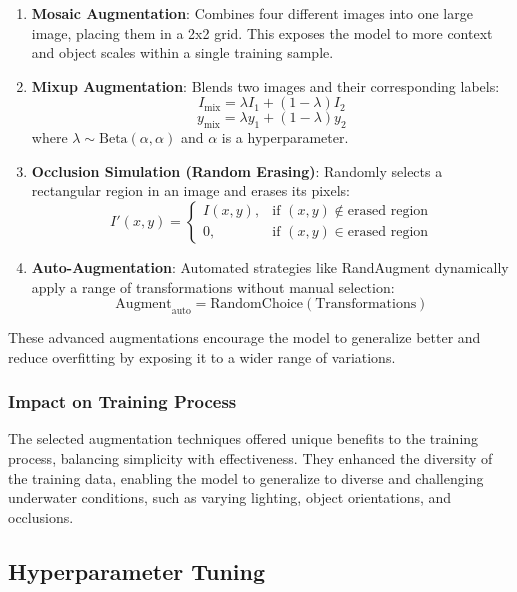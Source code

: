 \documentclass[conference]{IEEEtran}
\begin{document}
\begin{enumerate}
    \item \textbf{Mosaic Augmentation}:
    Combines four different images into one large image, placing them in a 2x2 grid. This exposes the model to more context and object scales within a single training sample.

    \item \textbf{Mixup Augmentation}:
    Blends two images and their corresponding labels:
    \[
    I_{\text{mix}} = \lambda I_1 + (1 - \lambda) I_2
    \]
    \[
    y_{\text{mix}} = \lambda y_1 + (1 - \lambda) y_2
    \]
    where \( \lambda \sim \text{Beta}(\alpha, \alpha) \) and \( \alpha \) is a hyperparameter.

    \item \textbf{Occlusion Simulation (Random Erasing)}:
    Randomly selects a rectangular region in an image and erases its pixels:
    \[
    I'(x, y) =
    \begin{cases}
    I(x, y), & \text{if } (x, y) \notin \text{erased region} \\
    0, & \text{if } (x, y) \in \text{erased region}
    \end{cases}
    \]

    \item \textbf{Auto-Augmentation}:
    Automated strategies like RandAugment dynamically apply a range of transformations without manual selection:
    \[
    \text{Augment}_{\text{auto}} = \text{RandomChoice}(\text{Transformations})
    \]
\end{enumerate}

These advanced augmentations encourage the model to generalize better and reduce overfitting by exposing it to a wider range of variations.

\subsubsection{Impact on Training Process}

The selected augmentation techniques offered unique benefits to the training process, balancing simplicity with effectiveness. They enhanced the diversity of the training data, enabling the model to generalize to diverse and challenging underwater conditions, such as varying lighting, object orientations, and occlusions.

\subsection{Hyperparameter Tuning}
\end{document}
